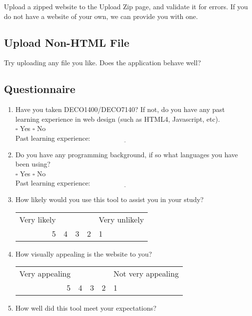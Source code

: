 Upload a zipped website to the Upload Zip page, and validate it for errors. If you do not have a website of your own, we can provide you with one.

\subsection*{Upload Non-HTML File}

Try uploading any file you like. Does the application behave well?

\newpage
\subsection*{Questionnaire}

\begin{enumerate}
\item Have you taken DECO1400/DECO7140? If not, do you have any past learning experience in web design (such as HTML4, Javascript, etc). \\ $\square$ Yes $\square$ No \\ Past learning experience: $\underline{\hspace{4cm}}$
\item Do you have any programming background, if so what languages you have been using? \\ $\square$ Yes $\square$ No \\ Past learning experience: $\underline{\hspace{4cm}}$
\item How likely would you use this tool to assist you in your study? \\ 
\begin{center}
\begin{tabular}{r | c | c | c | l}
Very likely & ~ & ~ & ~ & Very unlikely \\
5 & 4 & 3 & 2 & 1
\end{tabular}
\end{center}
\item How visually appealing is the website to you? \\
\begin{center}
\begin{tabular}{r | c | c | c | l}
Very appealing & ~ & ~ & ~ & Not very appealing \\
5 & 4 & 3 & 2 & 1
\end{tabular}
\end{center}
\item How well did this tool meet your expectations? \\

\end{enumerate}
